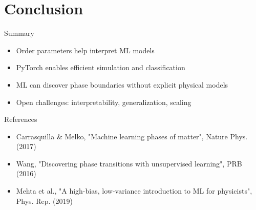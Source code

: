 \documentclass{beamer}
\begin{document}
\section{Conclusion}

\begin{frame}{Summary}
 \begin{itemize}
   \item Order parameters help interpret ML models
   \item PyTorch enables efficient simulation and classification
   \item ML can discover phase boundaries without explicit physical models
   \item Open challenges: interpretability, generalization, scaling
 \end{itemize}
\end{frame}

\begin{frame}{References}
 \footnotesize
 \begin{itemize}
   \item Carrasquilla \& Melko, "Machine learning phases of matter", Nature Phys. (2017)
   \item Wang, "Discovering phase transitions with unsupervised learning", PRB (2016)
   \item Mehta et al., "A high-bias, low-variance introduction to ML for physicists", Phys. Rep. (2019)
 \end{itemize}
\end{frame}
\end{document}
